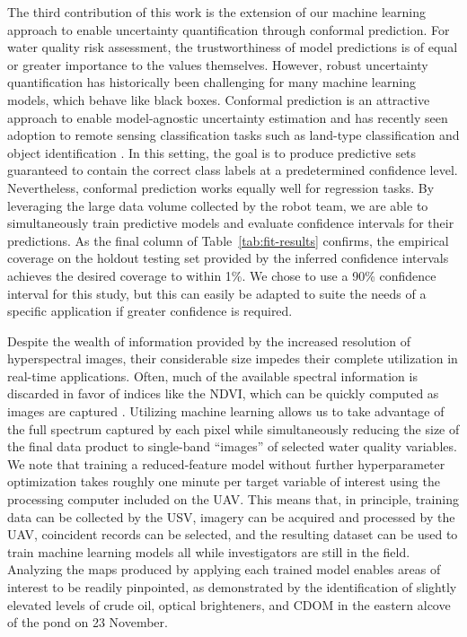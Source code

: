 \documentclass[remotesensing,article,accept,pdftex,moreauthors]{Definitions/mdpi}
\begin{document}
The third contribution of this work is the extension of our machine learning approach to enable uncertainty quantification through conformal prediction. For water quality risk assessment, the trustworthiness of model predictions is of equal or greater importance to the values themselves. However, robust uncertainty quantification has historically been challenging for many machine learning models, which behave like black boxes.
Conformal prediction is an attractive approach to enable model-agnostic uncertainty estimation and has recently seen adoption to remote sensing classification tasks such as land-type classification and object identification \cite{valle2023quantifying, zhu2024inductive}. In this setting, the goal is to produce predictive sets guaranteed to contain the correct class labels at a predetermined confidence level. Nevertheless, conformal prediction works equally well for regression tasks. By leveraging the large data volume collected by the robot team, we are able to simultaneously train predictive models and evaluate confidence intervals for their predictions. As the final column of Table~\ref{tab:fit-results} confirms, the empirical coverage on the holdout testing set provided by the inferred confidence intervals achieves the desired coverage to within 1\%. We chose to use a 90\% confidence interval for this study, but this can easily be adapted to suite the needs of a specific application if greater confidence is required. 

Despite the wealth of information provided by the increased resolution of hyperspectral images, their considerable size impedes their complete utilization in real-time applications. Often, much of the available spectral information is discarded in favor of indices like the NDVI, which can be quickly computed as images are captured \cite{horstrand2019uav}. Utilizing machine learning allows us to take advantage of the full spectrum captured by each pixel while simultaneously reducing the size of the final data product to single-band ``images'' of selected water quality variables. We note that training a reduced-feature model without further hyperparameter optimization takes roughly one minute per target variable of interest using the processing computer included on the UAV. This means that, in principle, training data can be collected by the USV, imagery can be acquired and processed by the UAV, coincident records can be selected, and the resulting dataset can be used to train machine learning models all while investigators are still in the field. Analyzing the maps produced by applying each trained model enables areas of interest to be readily pinpointed, as demonstrated by the identification of slightly elevated levels of %
crude oil, optical brighteners, and CDOM in the eastern alcove of the pond on 23 November. 
\end{document}
